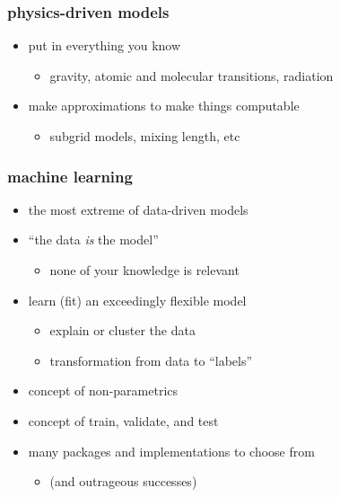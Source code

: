 \documentclass[pdftex]{beamer}
\begin{document}
\begin{frame}
  \frametitle{physics-driven models}
  \begin{itemize}
  \item put in everything you know
    \begin{itemize}
    \item gravity, atomic and molecular transitions, radiation
    \end{itemize}
  \item make approximations to make things computable
    \begin{itemize}
    \item subgrid models, mixing length, etc
    \end{itemize}
  \end{itemize}
\end{frame}

\begin{frame}
  \frametitle{machine learning}
  \begin{itemize}
  \item the most extreme of data-driven models
  \item ``the data \emph{is} the model''
    \begin{itemize}
    \item none of your knowledge is relevant
    \end{itemize}
  \item learn (fit) an exceedingly flexible model
    \begin{itemize}
    \item explain or cluster the data
    \item transformation from data to ``labels''
    \end{itemize}
  \item concept of non-parametrics
  \item concept of train, validate, and test
  \item many packages and implementations to choose from
    \begin{itemize}
    \item (and outrageous successes)
    \end{itemize}
  \end{itemize}
\end{frame}
\end{document}
